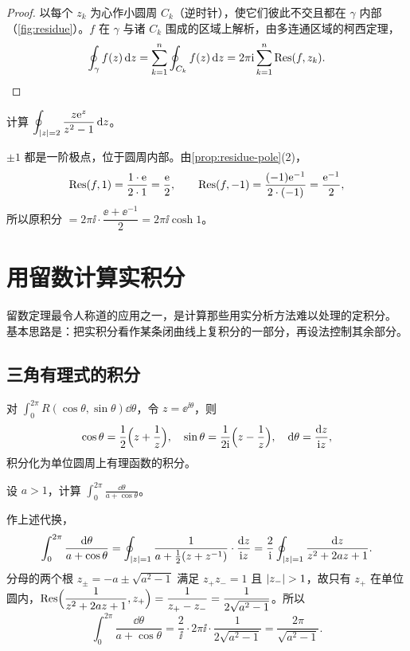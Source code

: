 \documentclass{mojing-notes}
\begin{document}
\begin{proof}
以每个 $z_k$ 为心作小圆周 $C_k$（逆时针），使它们彼此不交且都在 $\gamma$ 内部
（\cref{fig:residue}）。$f$ 在 $\gamma$ 与诸 $C_k$ 围成的区域上解析，由多连通区域的柯西定理，
\[
  \oint_\gamma f(z)\mathop{}\!\mathrm{d} z=\sum_{k=1}^n\oint_{C_k}f(z)\mathop{}\!\mathrm{d} z=2\pi\mathrm{i}\sum_{k=1}^n\operatorname{Res}(f,z_k). \qedhere
\]
\end{proof}

\begin{example}
计算 $\displaystyle\oint_{\lvert z\rvert=2}\frac{z\mathrm{e}^z}{z^2-1}\mathop{}\!\mathrm{d} z$。
\end{example}

\begin{solution}
$\pm1$ 都是一阶极点，位于圆周内部。由\cref{prop:residue-pole}(2)，
\[
  \operatorname{Res}(f,1)=\frac{1\cdot\mathrm{e}}{2\cdot1}=\frac{\mathrm{e}}{2},\qquad
  \operatorname{Res}(f,-1)=\frac{(-1)\mathrm{e}^{-1}}{2\cdot(-1)}=\frac{\mathrm{e}^{-1}}{2},
\]
所以原积分 $=2\pi\ii\cdot\dfrac{\ee+\ee^{-1}}{2}=2\pi\ii\cosh1$。
\end{solution}

\section{用留数计算实积分}

留数定理最令人称道的应用之一，是计算那些用实分析方法难以处理的定积分。
基本思路是：把实积分看作某条闭曲线上复积分的一部分，再设法控制其余部分。

\subsection{三角有理式的积分}

对 $\int_0^{2\pi}R(\cos\theta,\sin\theta)\dd\theta$，令 $z=\ee^{\ii\theta}$，则
\[
  \cos\theta=\frac12\Bigl(z+\frac1z\Bigr),\quad
  \sin\theta=\frac1{2\mathrm{i}}\Bigl(z-\frac1z\Bigr),\quad
  \mathop{}\!\mathrm{d}\theta=\frac{\mathop{}\!\mathrm{d} z}{\mathrm{i} z},
\]
积分化为单位圆周上有理函数的积分。

\begin{example}\label{ex:trig}
设 $a>1$，计算 $\displaystyle\int_0^{2\pi}\frac{\dd\theta}{a+\cos\theta}$。
\end{example}

\begin{solution}
作上述代换，
\[
  \int_0^{2\pi}\frac{\mathop{}\!\mathrm{d}\theta}{a+\cos\theta}
  =\oint_{\lvert z\rvert=1}\frac{1}{a+\frac12(z+z^{-1})}\cdot\frac{\mathop{}\!\mathrm{d} z}{\mathrm{i} z}
  =\frac{2}{\mathrm{i}}\oint_{\lvert z\rvert=1}\frac{\mathop{}\!\mathrm{d} z}{z^2+2az+1}.
\]
分母的两个根 $z_\pm=-a\pm\sqrt{a^2-1}$ 满足 $z_+z_-=1$ 且 $\lvert z_-\rvert>1$，故只有 $z_+$
在单位圆内，$\operatorname{Res}\Bigl(\dfrac{1}{z^2+2az+1},z_+\Bigr)=\dfrac{1}{z_+-z_-}=\dfrac{1}{2\sqrt{a^2-1}}$。所以
\[
  \int_0^{2\pi}\frac{\dd\theta}{a+\cos\theta}
  =\frac2\ii\cdot2\pi\ii\cdot\frac{1}{2\sqrt{a^2-1}}=\frac{2\pi}{\sqrt{a^2-1}}.
\]
\end{solution}
\end{document}
